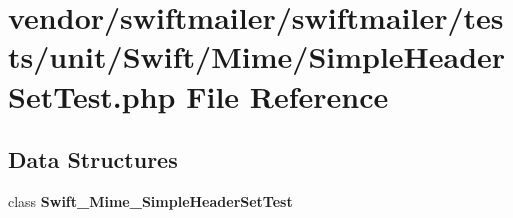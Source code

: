 \section{vendor/swiftmailer/swiftmailer/tests/unit/\+Swift/\+Mime/\+Simple\+Header\+Set\+Test.php File Reference}
\label{_simple_header_set_test_8php}
\subsection*{Data Structures}
\begin{DoxyCompactItemize}
\item 
class {\bf Swift\+\_\+\+Mime\+\_\+\+Simple\+Header\+Set\+Test}
\end{DoxyCompactItemize}
